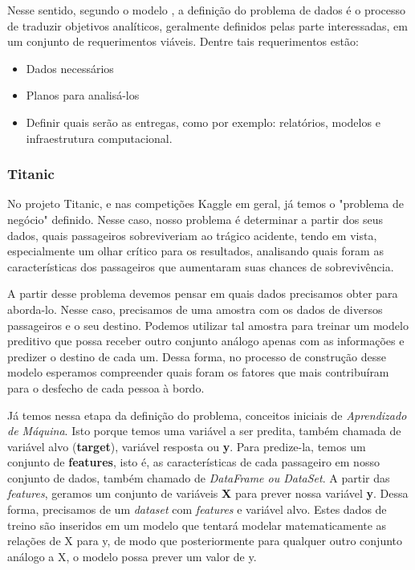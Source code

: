 \documentclass{article}
\begin{document}
Nesse sentido, segundo o modelo \cite{BATON}, a definição do problema de dados é o processo de traduzir objetivos analíticos, geralmente definidos pelas parte interessadas, em um conjunto de requerimentos viáveis. Dentre tais requerimentos estão:
\begin{itemize}
\item Dados necessários
\item Planos para analisá-los
\item Definir quais serão as entregas, como por exemplo: relatórios, modelos e infraestrutura computacional. 
\end{itemize}

\subsubsection{Titanic}

No projeto Titanic, e nas competições Kaggle em geral, já temos o "problema de negócio" definido. Nesse caso, nosso problema é determinar a partir dos seus dados, quais passageiros sobreviveriam ao trágico acidente, tendo em vista, especialmente um olhar crítico para os resultados, analisando quais foram as características dos passageiros que aumentaram suas chances de sobrevivência.

A partir desse problema devemos pensar em quais dados precisamos obter para aborda-lo. Nesse caso, precisamos de uma amostra com os dados de diversos passageiros e o seu destino. Podemos utilizar tal amostra para treinar um modelo preditivo que possa receber outro conjunto análogo apenas com as informações e predizer o destino de cada um. Dessa forma, no processo de construção desse modelo esperamos compreender quais foram os fatores que mais contribuíram para o desfecho de cada pessoa à bordo. 

Já temos nessa etapa da definição do problema, conceitos iniciais de \textit{Aprendizado de Máquina}. Isto porque temos uma variável a ser predita, também chamada de variável alvo (\textbf{target}), variável resposta ou \textbf{y}. 
Para predize-la, temos um conjunto de \textbf{features}, isto é, as características de cada passageiro em nosso conjunto de dados, também chamado de \textit{DataFrame ou DataSet}. A partir das \emph{features}, geramos um conjunto de variáveis \textbf{X} para prever nossa variável \textbf{y}. 
Dessa forma, precisamos de um \emph{dataset} com \emph{features} e variável alvo. 
Estes dados de treino são inseridos em um modelo que tentará modelar matematicamente as relações de X para y, de modo que posteriormente para qualquer outro conjunto análogo a X, o modelo possa prever um valor de y. 
\end{document}
